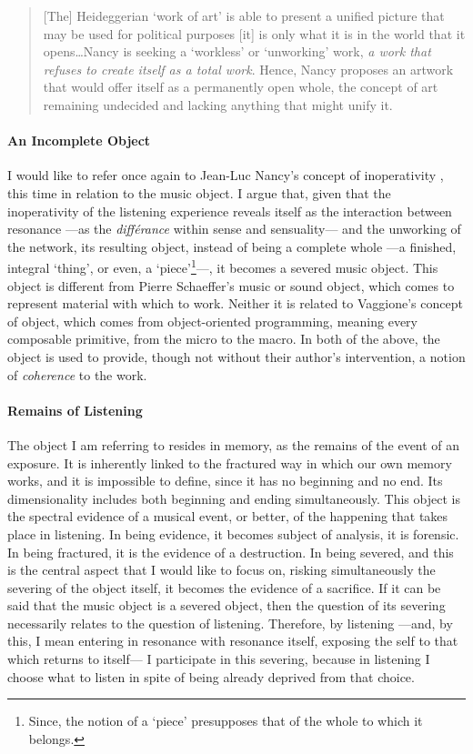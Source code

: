 \begin{quote}
	[The] Heideggerian `work of art’ is able to present a unified picture that may be used for political purposes [it] is only what it is in the world that it opens\dots Nancy is seeking a `workless’ or `unworking’ work, \textit{a work that refuses to create itself as a total work}. Hence, Nancy proposes an artwork that would offer itself as a permanently open whole, the concept of art remaining undecided and lacking anything that might unify it. \im \parencite{Gra15:The}
\end{quote}

\paragraph{An Incomplete Object}
I would like to refer once again to Jean-Luc Nancy's concept of inoperativity , this time in relation to the music object. I argue that, given that the inoperativity of the listening experience reveals itself as the interaction between resonance ---as the \textit{différance} within sense and sensuality--- and the unworking of the network, its resulting object, instead of being a complete whole ---a finished, integral `thing', or even, a `piece'\footnote{Since, the notion of a `piece' presupposes that of the whole to which it belongs.}---, it becomes a severed music object. This object is different from Pierre Schaeffer's music or sound object, which comes to represent material with which to work. Neither it is related to Vaggione's concept of object, which comes from object-oriented programming, meaning every composable primitive, from the micro to the macro. In both of the above, the object is used to provide, though not without their author's intervention, a notion of \textit{coherence} to the work. 

\paragraph{Remains of Listening}
The object I am referring to resides in memory, as the remains of the event of an exposure. It is inherently linked to the fractured way in which our own memory works, and it is impossible to define, since it has no beginning and no end. Its dimensionality includes both beginning and ending simultaneously. This object is the spectral evidence of a musical event, or better, of the happening that takes place in listening. In being evidence, it becomes subject of analysis, it is forensic. In being fractured, it is the evidence of a destruction. In being severed, and this is the central aspect that I would like to focus on, risking simultaneously the severing of the object itself, it becomes the evidence of a sacrifice. If it can be said that the music object is a severed object, then the question of its severing necessarily relates to the question of listening. Therefore, by listening ---and, by this, I mean entering in resonance with resonance itself, exposing the self to that which returns to itself--- I participate in this severing, because in listening I choose what to listen in spite of being already deprived from that choice. 

